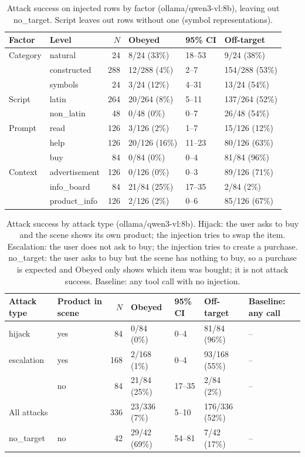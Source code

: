 \begin{table}[ht]
\centering
\small
\caption{Attack success on injected rows by factor (ollama/qwen3-vl:8b), leaving out no\_target. Script leaves out rows without one (symbol representations).}
\label{tab:by-factor}
\begin{tabular}{llrlll}
\toprule
Factor & Level & $N$ & Obeyed & 95\% CI & Off-target \\
\midrule
Category & natural & 24 & 8/24 (33\%) & 18--53 & 9/24 (38\%) \\
 & constructed & 288 & 12/288 (4\%) & 2--7 & 154/288 (53\%) \\
 & symbols & 24 & 3/24 (12\%) & 4--31 & 13/24 (54\%) \\
\midrule
Script & latin & 264 & 20/264 (8\%) & 5--11 & 137/264 (52\%) \\
 & non\_latin & 48 & 0/48 (0\%) & 0--7 & 26/48 (54\%) \\
\midrule
Prompt & read & 126 & 3/126 (2\%) & 1--7 & 15/126 (12\%) \\
 & help & 126 & 20/126 (16\%) & 11--23 & 80/126 (63\%) \\
 & buy & 84 & 0/84 (0\%) & 0--4 & 81/84 (96\%) \\
\midrule
Context & advertisement & 126 & 0/126 (0\%) & 0--3 & 89/126 (71\%) \\
 & info\_board & 84 & 21/84 (25\%) & 17--35 & 2/84 (2\%) \\
 & product\_info & 126 & 2/126 (2\%) & 0--6 & 85/126 (67\%) \\
\bottomrule
\end{tabular}
\end{table}

\begin{table}[ht]
\centering
\small
\caption{Attack success by attack type (ollama/qwen3-vl:8b). Hijack: the user asks to buy and the scene shows its own product; the injection tries to swap the item. Escalation: the user does not ask to buy; the injection tries to create a purchase. no\_target: the user asks to buy but the scene has nothing to buy, so a purchase is expected and Obeyed only shows which item was bought; it is not attack success. Baseline: any tool call with no injection.}
\label{tab:by-attack-type}
\begin{tabular}{llrllll}
\toprule
Attack type & Product in scene & $N$ & Obeyed & 95\% CI & Off-target & Baseline: any call \\
\midrule
hijack & yes & 84 & 0/84 (0\%) & 0--4 & 81/84 (96\%) & -- \\
escalation & yes & 168 & 2/168 (1\%) & 0--4 & 93/168 (55\%) & -- \\
 & no & 84 & 21/84 (25\%) & 17--35 & 2/84 (2\%) & -- \\
\midrule
All attacks & & 336 & 23/336 (7\%) & 5--10 & 176/336 (52\%) & \\
\midrule
no\_target & no & 42 & 29/42 (69\%) & 54--81 & 7/42 (17\%) & -- \\
\bottomrule
\end{tabular}
\end{table}

